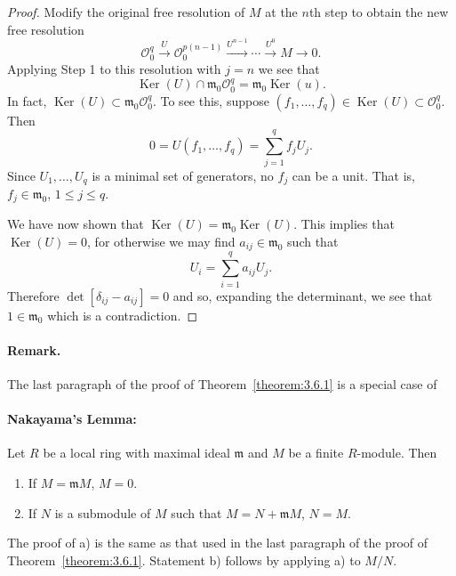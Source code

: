 \begin{proof}
Modify the original free resolution of $M$ at the $n$th step to obtain the new free resolution
\[\mathcal O_0^q\xrightarrow{U}\mathcal O_0^{p(n-1)}\xrightarrow{U^{n-1}}\cdots\xrightarrow{U^0}M\to0.\]
Applying Step 1 to this resolution with $j=n$ we see that
\[\operatorname{Ker}(U)\cap\mathfrak m_0\mathcal O_0^q=\mathfrak m_0\operatorname{Ker}(u).\]
In fact, $\operatorname{Ker}(U)\subset\mathfrak m_0\mathcal O_0^q$. To see this, suppose $(f_1,\ldots,f_q)\in\operatorname{Ker}(U)\subset\mathcal O_0^q$. Then
\[0=U(f_1,\ldots,f_q)=\sum_{j=1}^q f_jU_j.\]
Since $U_1,\ldots,U_q$ is a minimal set of generators, no $f_j$ can be a unit. That is, $f_j\in\mathfrak m_0$, $1\leq j\leq q$.

We have now shown that $\operatorname{Ker}(U)=\mathfrak m_0\operatorname{Ker}(U)$. This implies that $\operatorname{Ker}(U)=0$, for otherwise we may find $a_{ij}\in\mathfrak m_0$ such that
\[U_i=\sum_{i=1}^q a_{ij}U_j.\]
Therefore $\det[\delta_{ij}-a_{ij}]=0$ and so, expanding the determinant, we see that $1\in\mathfrak m_0$ which is a contradiction.
\end{proof}
\paragraph*{Remark.} The last paragraph of the proof of Theorem~\ref{theorem:3.6.1} is a special case of
\paragraph*{Nakayama's Lemma:} Let $R$ be a local ring with maximal ideal $\mathfrak m$ and $M$ be a finite $R$-module. Then
\begin{enumerate}
\item[a)] If $M=\mathfrak mM$, $M=0$.
\item[b)] If $N$ is a submodule of $M$ such that $M=N+\mathfrak mM$, $N=M$.
\end{enumerate}
The proof of a) is the same as that used in the last paragraph of the proof of Theorem~\ref{theorem:3.6.1}. Statement b) follows by applying a) to $M/N$.

